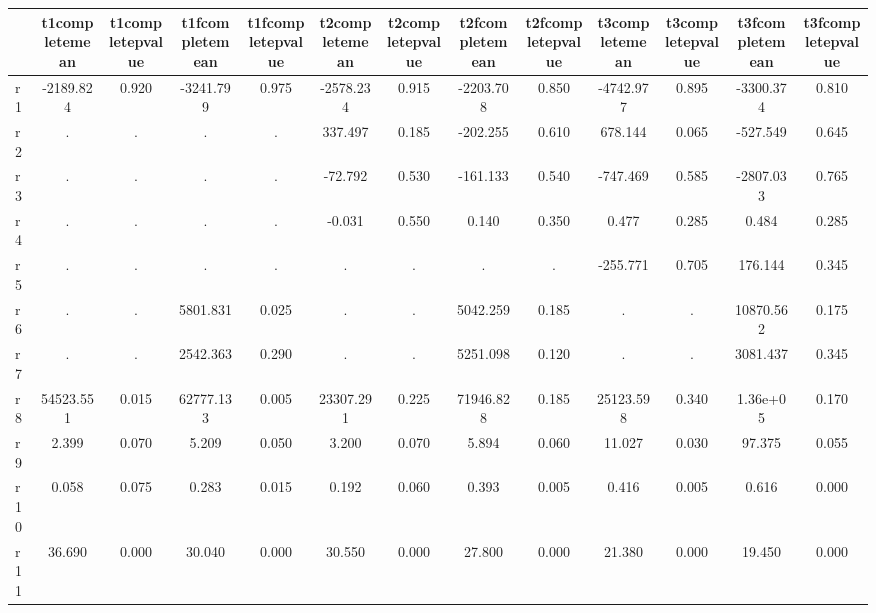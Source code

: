 \begin{table}[htbp]
\begin{tabular}{lcccccccccccc} \hline \hline
 & t1completemean  & t1completepvalue  & t1fcompletemean  & t1fcompletepvalue  & t2completemean  & t2completepvalue  & t2fcompletemean  & t2fcompletepvalue  & t3completemean  & t3completepvalue  & t3fcompletemean  & t3fcompletepvalue  \\  \hline 
r1 & -2189.824 &     0.920 & -3241.799 &     0.975 & -2578.234 &     0.915 & -2203.708 &     0.850 & -4742.977 &     0.895 & -3300.374 &     0.810 \\  
r2 &         . &         . &         . &         . &   337.497 &     0.185 &  -202.255 &     0.610 &   678.144 &     0.065 &  -527.549 &     0.645 \\  
r3 &         . &         . &         . &         . &   -72.792 &     0.530 &  -161.133 &     0.540 &  -747.469 &     0.585 & -2807.033 &     0.765 \\  
r4 &         . &         . &         . &         . &    -0.031 &     0.550 &     0.140 &     0.350 &     0.477 &     0.285 &     0.484 &     0.285 \\  
r5 &         . &         . &         . &         . &         . &         . &         . &         . &  -255.771 &     0.705 &   176.144 &     0.345 \\  
r6 &         . &         . &  5801.831 &     0.025 &         . &         . &  5042.259 &     0.185 &         . &         . & 10870.562 &     0.175 \\  
r7 &         . &         . &  2542.363 &     0.290 &         . &         . &  5251.098 &     0.120 &         . &         . &  3081.437 &     0.345 \\  
r8 & 54523.551 &     0.015 & 62777.133 &     0.005 & 23307.291 &     0.225 & 71946.828 &     0.185 & 25123.598 &     0.340 &  1.36e+05 &     0.170 \\  
r9 &     2.399 &     0.070 &     5.209 &     0.050 &     3.200 &     0.070 &     5.894 &     0.060 &    11.027 &     0.030 &    97.375 &     0.055 \\  
r10 &     0.058 &     0.075 &     0.283 &     0.015 &     0.192 &     0.060 &     0.393 &     0.005 &     0.416 &     0.005 &     0.616 &     0.000 \\  
r11 &    36.690 &     0.000 &    30.040 &     0.000 &    30.550 &     0.000 &    27.800 &     0.000 &    21.380 &     0.000 &    19.450 &     0.000 \\  
\hline \hline \end{tabular}
\end{table}
